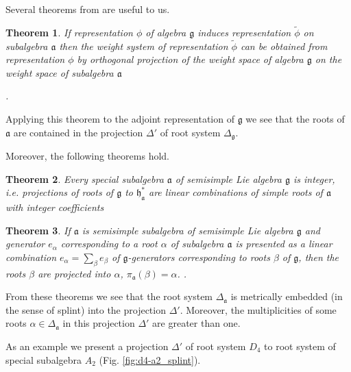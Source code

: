 \documentclass{article}
\newtheorem{theorem}{Theorem}
\newcommand{\pia}{\pi_{\mathfrak{a}}}
\newcommand{\gf}{\mathfrak{g}}
\newcommand{\af}{\mathfrak{a}}
\newcommand{\hf}{\mathfrak{h}}
\newcommand{\hfa}{\hf_{\af}}
\begin{document}

Several theorems from \cite{dynkin1952semisimple} are useful to us.

\begin{theorem}\label{dyn0}
  If representation $\phi$ of algebra $\gf$ induces representation $\tilde\phi$ on subalgebra $\af$ then
  the weight system of representation $\tilde\phi$ can be obtained from representation $\phi$ by
  orthogonal projection of the weight space of algebra $\gf$ on the weight space of subalgebra $\af$

  \cite{dynkin1952maximal}. %
\end{theorem}

Applying this theorem to the adjoint representation of $\gf$ we see that the roots of $\af$ are
contained in the projection $\Delta'$ of root system $\Delta_{\gf}$.

Moreover, the following theorems hold. 
\begin{theorem}\label{dyn1}
  Every special subalgebra $\af$ of semisimple Lie algebra $\gf$ is integer, i.e. projections of
  roots of $\gf$ to $\hfa^{*}$ are linear combinations of simple roots of $\af$ with integer
  coefficients \cite{dynkin1952semisimple}
\end{theorem}

\begin{theorem}\label{dyn2}
  If $\af$  is semisimple subalgebra of semisimple Lie algebra $\gf$ and generator $e_{\alpha}$ corresponding to
  a root $\alpha$ of subalgebra $\af$ is presented as a linear combination $e_{\alpha}=\sum_{\beta}
  e_{\beta}$ of $\gf$-generators
  corresponding to roots $\beta$ of $\gf$, then the roots $\beta$ are projected into $\alpha$,
  $\pia(\beta)=\alpha$. 
  \cite{dynkin1972semisimple,dynkin1952semisimple}. 
\end{theorem}

From these theorems we see that the root system $\Delta_{\af}$ is metrically embedded (in the sense
of splint) into the projection $\Delta'$. Moreover, the multiplicities of some roots
$\alpha\in\Delta_{\af}$ in this projection $\Delta'$ are greater than one. 

As an example we present a projection $\Delta'$ of root system $D_{4}$ to root system of special
subalgebra $A_{2}$ (Fig. \ref{fig:d4-a2_splint}).
\end{document}
